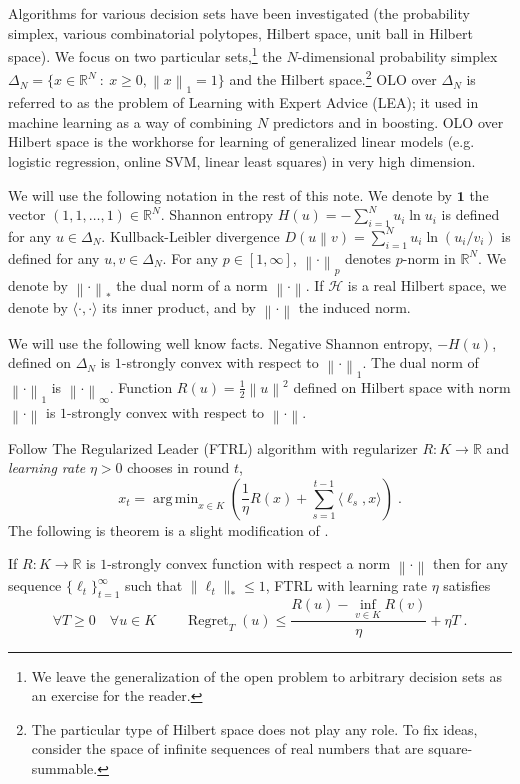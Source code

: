 \documentclass{colt2016} %
\DeclareMathOperator{\Regret}{Regret}
\newcommand{\R}{\mathbb{R}}     %
\renewcommand{\H}{\mathcal{H}}  %
\newcommand{\KL}[2]{D\left({#1}\middle\|{#2}\right)}  %
\newcommand{\norm}[1]{\left\|{#1}\right\|}
\DeclareMathOperator*{\argmin}{arg\,min}
\newcommand{\indicator}{\mathbf{1}}
\begin{document}
Algorithms for various decision sets have been investigated (the probability
simplex, various combinatorial polytopes, Hilbert space, unit ball in Hilbert
space). We focus on two particular sets,\footnote{We leave the generalization
of the open problem to arbitrary decision sets as an exercise for the reader.} the
$N$-dimensional probability simplex $\Delta_N = \{ x \in \R^N ~:~ x \ge 0,
\norm{x}_1 = 1\}$ and the Hilbert space.\footnote{The particular type of
Hilbert space does not play any role. To fix ideas, consider the space of
infinite sequences of real numbers that are square-summable.} OLO over
$\Delta_N$ is referred to as the problem of Learning with Expert Advice (LEA);
it used in machine learning as a way of combining $N$ predictors and in
boosting. OLO over Hilbert space is the workhorse for learning of generalized
linear models (e.g. logistic regression, online SVM, linear least squares) in
very high dimension.

We will use the following notation in the rest of this note. We denote by
$\indicator$ the vector $(1,1,\dots,1) \in \R^N$. Shannon entropy $H(u) =
-\sum_{i=1}^N u_i \ln u_i$ is defined for any $u \in \Delta_N$.  Kullback-Leibler
divergence $\KL{u}{v} = \sum_{i=1}^N u_i \ln(u_i/v_i)$ is defined for any $u,v \in
\Delta_N$. For any $p \in [1,\infty]$, $\norm{\cdot}_p$ denotes $p$-norm in
$\R^N$.  We denote by $\norm{\cdot}_*$ the dual norm of a norm $\norm{\cdot}$.
If $\H$ is a real Hilbert space, we denote by $\langle \cdot, \cdot \rangle$
its inner product, and by $\norm{\cdot}$ the induced norm.

We will use the following well know facts.  Negative Shannon entropy, $-H(u)$,
defined on $\Delta_N$ is $1$-strongly convex with respect to $\norm{\cdot}_1$.
The dual norm of $\norm{\cdot}_1$ is $\norm{\cdot}_\infty$.  Function $R(u) =
\frac{1}{2}\norm{u}^2$ defined on Hilbert space with norm $\norm{\cdot}$ is
$1$-strongly convex with respect to $\norm{\cdot}$.

Follow The Regularized Leader (FTRL) algorithm with regularizer $R:K \to \R$
and \emph{learning rate} $\eta > 0$ chooses in round $t$,
$$
x_t = \argmin_{x \in K} \left( \frac{1}{\eta} R(x) + \sum_{s=1}^{t-1} \langle \ell_s, x \rangle \right) \; .
$$
The following is theorem is a slight modification of \citet[Theorem 2.11]{Shalev-Shwartz-2011}.
\begin{theorem}
\label{theorem:ftrl-regret}
If $R:K \to \R$ is $1$-strongly convex function with respect a norm $\norm{\cdot}$
then for any sequence $\{\ell_t\}_{t=1}^\infty$ such that $\|\ell_t\|_* \le 1$,
FTRL with learning rate $\eta$ satisfies
$$
\forall T \ge 0 \quad \forall u \in K \qquad \Regret_T(u) \le \frac{R(u) - \inf_{v \in K} R(v)}{\eta} + \eta T \; .
$$
\end{theorem}
\end{document}
